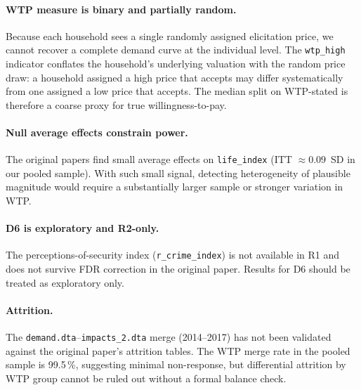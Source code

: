 \documentclass[12pt]{article}
\begin{document}
\paragraph{WTP measure is binary and partially random.}
Because each household sees a single randomly assigned elicitation
price, we cannot recover a complete demand curve at the individual
level. The \texttt{wtp\_high} indicator conflates the household's
underlying valuation with the random price draw: a household assigned
a high price that accepts may differ systematically from one assigned a
low price that accepts. The median split on WTP-stated is therefore a
coarse proxy for true willingness-to-pay.

\paragraph{Null average effects constrain power.}
The original papers find small average effects on \texttt{life\_index}
(ITT $\approx 0.09$~SD in our pooled sample). With such small signal,
detecting heterogeneity of plausible magnitude would require a
substantially larger sample or stronger variation in WTP.

\paragraph{D6 is exploratory and R2-only.}
The perceptions-of-security index (\texttt{r\_crime\_index}) is not
available in R1 and does not survive FDR correction in the original
paper. Results for D6 should be treated as exploratory only.

\paragraph{Attrition.}
The \texttt{demand.dta}--\texttt{impacts\_2.dta} merge (2014--2017)
has not been validated against the original paper's attrition tables.
The WTP merge rate in the pooled sample is 99.5\,\%, suggesting minimal
non-response, but differential attrition by WTP group cannot be ruled
out without a formal balance check.
\end{document}
